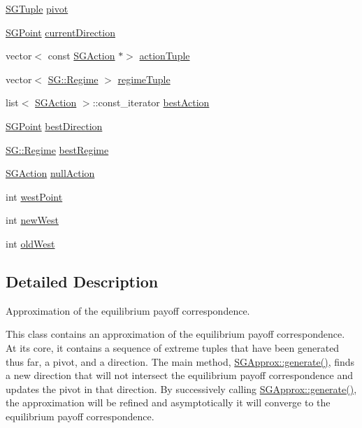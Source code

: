 \begin{DoxyCompactItemize}
\item 
\hyperlink{classSGTuple}{S\+G\+Tuple} \hyperlink{classSGApprox_a037c73ff2b6ff8a55fadf57bb0a6a546}{pivot}
\item 
\hyperlink{classSGPoint}{S\+G\+Point} \hyperlink{classSGApprox_ac5bf5f2eba2d65c8a9933b6d74f0cd47}{current\+Direction}
\item 
vector$<$ const \hyperlink{classSGAction}{S\+G\+Action} $\ast$$>$ \hyperlink{classSGApprox_a507eb6895c5a99c5d1efba8107989187}{action\+Tuple}
\item 
vector$<$ \hyperlink{namespaceSG_a139e4dec41ea0f38aae1f93f60cfff60}{S\+G\+::\+Regime} $>$ \hyperlink{classSGApprox_a01f7878f807a2143ce4a7b64bf3cc110}{regime\+Tuple}
\item 
list$<$ \hyperlink{classSGAction}{S\+G\+Action} $>$\+::const\+\_\+iterator \hyperlink{classSGApprox_a919c56cbea93b91c7ce4cd62201633e1}{best\+Action}
\item 
\hyperlink{classSGPoint}{S\+G\+Point} \hyperlink{classSGApprox_a20454173d5c9af9bd24870d97f4e2b91}{best\+Direction}
\item 
\hyperlink{namespaceSG_a139e4dec41ea0f38aae1f93f60cfff60}{S\+G\+::\+Regime} \hyperlink{classSGApprox_ab2bc5dff1ce46dfe8eb035955b2642fc}{best\+Regime}
\item 
\hyperlink{classSGAction}{S\+G\+Action} \hyperlink{classSGApprox_ad2aeb05506b86560b35a0a812f95c4be}{null\+Action}
\item 
int \hyperlink{classSGApprox_aa0c6296f28ce5527edc9829e4d9c23a1}{west\+Point}
\item 
int \hyperlink{classSGApprox_aed002d6e06e7199e10b3ac4f27b6cb6c}{new\+West}
\item 
int \hyperlink{classSGApprox_a130b9dc6e354a70a0f3cf08c5a511c99}{old\+West}
\end{DoxyCompactItemize}


\subsection{Detailed Description}
Approximation of the equilibrium payoff correspondence. 

This class contains an approximation of the equilibrium payoff correspondence. At its core, it contains a sequence of extreme tuples that have been generated thus far, a pivot, and a direction. The main method, \hyperlink{classSGApprox_a9cf7330f7cab3f454b0850e778d132fa}{S\+G\+Approx\+::generate()}, finds a new direction that will not intersect the equilibrium payoff correspondence and updates the pivot in that direction. By successively calling \hyperlink{classSGApprox_a9cf7330f7cab3f454b0850e778d132fa}{S\+G\+Approx\+::generate()}, the approximation will be refined and asymptotically it will converge to the equilibrium payoff correspondence.

